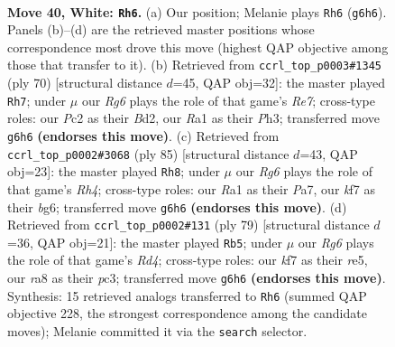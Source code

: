 \documentclass[11pt]{article}
\begin{document}
\clearpage

\begin{figure}[p]\centering
\begin{subfigure}{0.46\textwidth}\centering
\resizebox{\linewidth}{!}{%
\newchessgame
\chessboard[
  setfen={r7/3b1k2/2n3R1/6B1/1p1p2P1/pP6/P1PN3K/R7 w - - 2 40},
  showmover=false,
  pgfstyle=straightmove, color=movearrow, markmove={g6-h6}
]}
\caption{}
\end{subfigure}\hfill
\begin{subfigure}{0.46\textwidth}\centering
\resizebox{\linewidth}{!}{%
\newchessgame
\chessboard[
  setfen={3r4/pp1nR3/5k1p/2p5/2Pp1P2/1P5P/P2BK3/8 w - - 8 36},
  showmover=false,
  pgfstyle=straightmove, color=movearrow, markmove={e7-h7}
]}
\caption{}
\end{subfigure}
\\[4pt]
\begin{subfigure}{0.46\textwidth}\centering
\resizebox{\linewidth}{!}{%
\newchessgame
\chessboard[
  setfen={3k4/p2n4/1p4B1/2pP3r/b1P2pNp/P6K/5P2/4R3 b - - 10 43},
  showmover=false,
  pgfstyle=straightmove, color=movearrow, markmove={h5-h8}
]}
\caption{}
\end{subfigure}\hfill
\begin{subfigure}{0.46\textwidth}\centering
\resizebox{\linewidth}{!}{%
\newchessgame
\chessboard[
  setfen={2n5/3b1pk1/1p4p1/3rR1P1/p7/P1P2NK1/1PB5/8 b - - 9 40},
  showmover=false,
  pgfstyle=straightmove, color=movearrow, markmove={d5-b5}
]}
\caption{}
\end{subfigure}
\caption{\textbf{Move 40, White: \texttt{Rh6}.} (a) Our position; Melanie plays \texttt{Rh6} (\texttt{g6h6}). Panels (b)--(d) are the retrieved master positions whose correspondence most drove this move (highest QAP objective among those that transfer to it). (b) Retrieved from \texttt{ccrl\_top\_p0003\#1345} (ply 70) [structural distance $d$=45, QAP obj=32]: the master played \texttt{Rh7}; under $\mu$ our \emph{Rg6} plays the role of that game's \emph{Re7}; cross-type roles: our \emph{P}c2 as their \emph{B}d2, our \emph{R}a1 as their \emph{P}h3; transferred move \texttt{g6h6} \textbf{(endorses this move)}. (c) Retrieved from \texttt{ccrl\_top\_p0002\#3068} (ply 85) [structural distance $d$=43, QAP obj=23]: the master played \texttt{Rh8}; under $\mu$ our \emph{Rg6} plays the role of that game's \emph{Rh4}; cross-type roles: our \emph{R}a1 as their \emph{P}a7, our \emph{k}f7 as their \emph{b}g6; transferred move \texttt{g6h6} \textbf{(endorses this move)}. (d) Retrieved from \texttt{ccrl\_top\_p0002\#131} (ply 79) [structural distance $d$=36, QAP obj=21]: the master played \texttt{Rb5}; under $\mu$ our \emph{Rg6} plays the role of that game's \emph{Rd4}; cross-type roles: our \emph{k}f7 as their \emph{r}e5, our \emph{r}a8 as their \emph{p}c3; transferred move \texttt{g6h6} \textbf{(endorses this move)}. Synthesis: 15 retrieved analogs transferred to \texttt{Rh6} (summed QAP objective 228, the strongest correspondence among the candidate moves); Melanie committed it via the \texttt{search} selector.}
\label{fig:thought-m78}
\end{figure}
\end{document}
